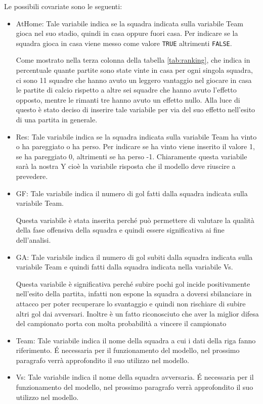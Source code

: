 Le possibili covariate sono le seguenti:
\begin{itemize}
	\item \textsf{AtHome}: Tale variabile indica se la squadra indicata sulla variabile \textsf{Team} gioca nel suo stadio, quindi in casa oppure fuori casa. Per indicare se la squadra gioca in casa viene messo come valore \texttt{TRUE} altrimenti \texttt{FALSE}. 
	
	Come mostrato nella terza colonna della tabella \ref{tab:ranking}, che indica in percentuale quante partite sono state vinte in casa per ogni singola squadra, ci sono 11 squadre che hanno avuto un leggero vantaggio nel giocare in casa le partite di calcio rispetto a altre sei squadre che hanno avuto l'effetto opposto, mentre le rimanti tre hanno avuto un effetto nullo. Alla luce di questo è stato deciso di inserire tale variabile per via del suo effetto nell'esito di una partita in generale.
	\item \textsf{Res}: Tale variabile indica se la squadra indicata sulla variabile \textsf{Team} ha vinto o ha pareggiato o ha perso. Per indicare se ha vinto viene inserito il valore 1, se ha pareggiato 0, altrimenti se ha perso -1. Chiaramente questa variabile sarà la nostra Y cioè la variabile risposta che il modello deve riuscire a prevedere.
	\item \textsf{GF}: Tale variabile indica il numero di gol fatti dalla squadra indicata sulla variabile \textsf{Team}. 
	
	Questa variabile è stata inserita perché può permettere di valutare la qualità della fase offensiva della squadra e quindi essere significativa ai fine dell'analisi.
	\item \textsf{GA}: Tale variabile indica il numero di gol subiti dalla squadra indicata sulla variabile \textsf{Team} e quindi fatti dalla squadra indicata nella variabile \textsf{Vs}. 
	
	Questa variabile è significativa perché subire pochi gol incide positivamente nell'esito della partita, infatti non espone la squadra a doversi sbilanciare in attacco per poter recuperare lo svantaggio e quindi non rischiare di subire altri gol dai avversari. Inoltre è un fatto riconosciuto che aver la miglior difesa del campionato porta con molta probabilità a vincere il campionato
	\item \textsf{Team}: Tale variabile indica il nome della squadra a cui i dati della riga fanno riferimento. É necessaria per il funzionamento del modello, nel prossimo paragrafo verrà approfondito il suo utilizzo nel modello.
	\item \textsf{Vs}: Tale variabile indica il nome della squadra avversaria. É necessaria per il funzionamento del modello, nel prossimo paragrafo verrà approfondito il suo utilizzo nel modello.
	

\end{itemize}
